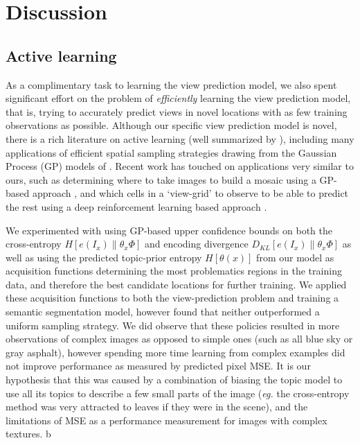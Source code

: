 \section{Discussion} \label{sec:spatial-prediction-discussion}
\subsection{Active learning}\label{sec:active-learning}
As a complimentary task to learning the view prediction model, we also spent significant effort on the problem of \emph{efficiently} learning the view prediction model, that is, trying to accurately predict views in novel locations with as few training observations as possible. Although our specific view prediction model is novel, there is a rich literature on active learning (well summarized by \citep{settles2012active}), including many applications of efficient spatial sampling strategies drawing from the Gaussian Process (GP) models of \citep{Seo2000,guestrin2005near}. Recent work has touched on applications very similar to ours, such as determining where to take images to build a mosaic using a GP-based approach \citep{sandeep_crv_2016}, and which cells in a `view-grid' to observe to be able to predict the rest using a deep reinforcement learning based approach \citep{Jayaraman2017}.

We experimented with using GP-based upper confidence bounds on both the cross-entropy $H\left[e(I_x) \| \theta_x\Phi \right]$ and encoding divergence $D_{KL}\left[e(I_x) \| \theta_x\Phi\right]$ as well as using the predicted topic-prior entropy $H\left[\theta(x)\right]$ from our model as acquisition functions determining the most problematics regions in the training data, and therefore the best candidate locations for further training. We applied these acquisition functions to both the view-prediction problem and training a semantic segmentation model, however found that neither outperformed a uniform sampling strategy. We did observe that these policies resulted in more observations of complex images as opposed to simple ones (such as all blue sky or gray asphalt), however spending more time learning from complex examples did not improve performance as measured by predicted pixel MSE. It is our hypothesis that this was caused by a combination of biasing the topic model to use all its topics to describe a few small parts of the image (\emph{eg.} the cross-entropy method was very attracted to leaves if they were in the scene), and the limitations of MSE as a performance measurement for images with complex textures.
b
